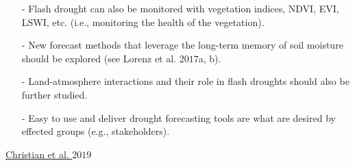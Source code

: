 \documentclass[12pt, letterpaper]{article}
\begin{document}
\begin{itemize}
        \item[-] Flash drought can also be monitored with vegetation indices, NDVI, EVI, LSWI, etc. 
                 (i.e., monitoring the health of the vegetation).
        \item[-] New forecast methods that leverage the long-term memory of soil moisture should be
                 explored (see Lorenz et al. $2017$a, b).
        \item[-] Land-atmosphere interactions and their role in flash droughts should also be further
                 studied.
        \item[-] Easy to use and deliver drought forecasting tools are what are desired by effected 
                 groups (e.g., stakeholders).
	\end{itemize}
    \par \par
    \underline{Christian et al. $2019$}
\end{document}
